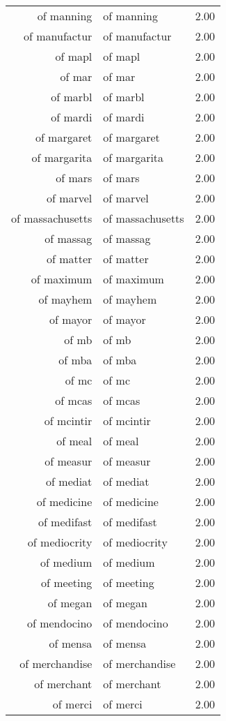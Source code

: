 \begin{table}[ht]
\begin{tabular}{rlr}
  of manning & of manning & 2.00 \\ 
  of manufactur & of manufactur & 2.00 \\ 
  of mapl & of mapl & 2.00 \\ 
  of mar & of mar & 2.00 \\ 
  of marbl & of marbl & 2.00 \\ 
  of mardi & of mardi & 2.00 \\ 
  of margaret & of margaret & 2.00 \\ 
  of margarita & of margarita & 2.00 \\ 
  of mars & of mars & 2.00 \\ 
  of marvel & of marvel & 2.00 \\ 
  of massachusetts & of massachusetts & 2.00 \\ 
  of massag & of massag & 2.00 \\ 
  of matter & of matter & 2.00 \\ 
  of maximum & of maximum & 2.00 \\ 
  of mayhem & of mayhem & 2.00 \\ 
  of mayor & of mayor & 2.00 \\ 
  of mb & of mb & 2.00 \\ 
  of mba & of mba & 2.00 \\ 
  of mc & of mc & 2.00 \\ 
  of mcas & of mcas & 2.00 \\ 
  of mcintir & of mcintir & 2.00 \\ 
  of meal & of meal & 2.00 \\ 
  of measur & of measur & 2.00 \\ 
  of mediat & of mediat & 2.00 \\ 
  of medicine & of medicine & 2.00 \\ 
  of medifast & of medifast & 2.00 \\ 
  of mediocrity & of mediocrity & 2.00 \\ 
  of medium & of medium & 2.00 \\ 
  of meeting & of meeting & 2.00 \\ 
  of megan & of megan & 2.00 \\ 
  of mendocino & of mendocino & 2.00 \\ 
  of mensa & of mensa & 2.00 \\ 
  of merchandise & of merchandise & 2.00 \\ 
  of merchant & of merchant & 2.00 \\ 
  of merci & of merci & 2.00 \\ 

\end{tabular}
\end{table}
